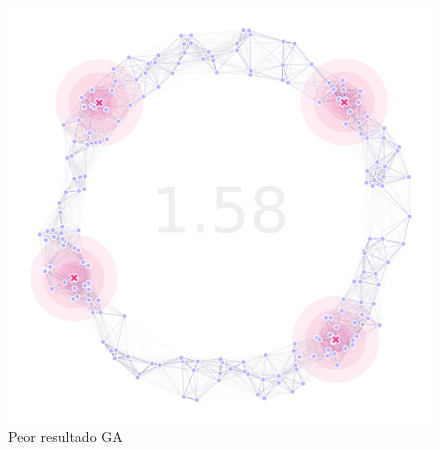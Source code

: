 \documentclass[letterpaper]{report}
\begin{document}
    \begin{figure}[ht!]
      \centering
      \includegraphics[width=\textwidth]{ga-worst.png}
      \caption{Peor resultado GA}
      \label{fig:ga-worst}
    \end{figure}

\end{document}
